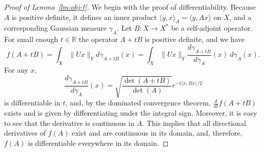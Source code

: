 \documentclass[11pt]{article}
\newcommand{\R}{{\mathbb{R}}}
\begin{document}
\begin{proof}[Proof of Lemma~\ref{lm:obj-f}]
  We begin with the proof of differentiability. Because $A$ is
  positive definite, it defines an inner product $\langle y,x\rangle_A
  = \langle y, Ax\rangle$ on $X$, and a corresponding Gaussian measure
  $\gamma_A$. Let $B:X \to X^*$ be a self-adjoint operator. For small
  enough $t \in \R$ the operator $A + tB$ is positive definite, and we
  have
  \[
  f(A+tB)  = \int_X \|Ux\|_Y d\gamma_{A + tB}(x)
  = \int_X \|Ux\|_Y \frac{d\gamma_{A+tB}}{d\gamma_A}(x)\ d\gamma_A(x).
  \]
  For any $x$, 
  \[
  \frac{d\gamma_{A+tB}}{d\gamma_A}(x) =
  \sqrt{\frac{\det(A+tB)}{\det(A)}} e^{-t\langle x, Bx\rangle / 2}
  \]
  is differentiable in $t$, and, by the dominated convergence theorem,
  $\frac{d}{dt}f(A+tB)$ exists and is given by differentiating under the
  integral sign. Moreover, it is easy to see that the derivative is
  continuous in $A$. This implies that all directional derivatives of $f(A)$
  exist and are continuous in its domain, and, therefore, $f(A)$ is
  differentiable everywhere in its domain. 


\end{proof}
\end{document}
